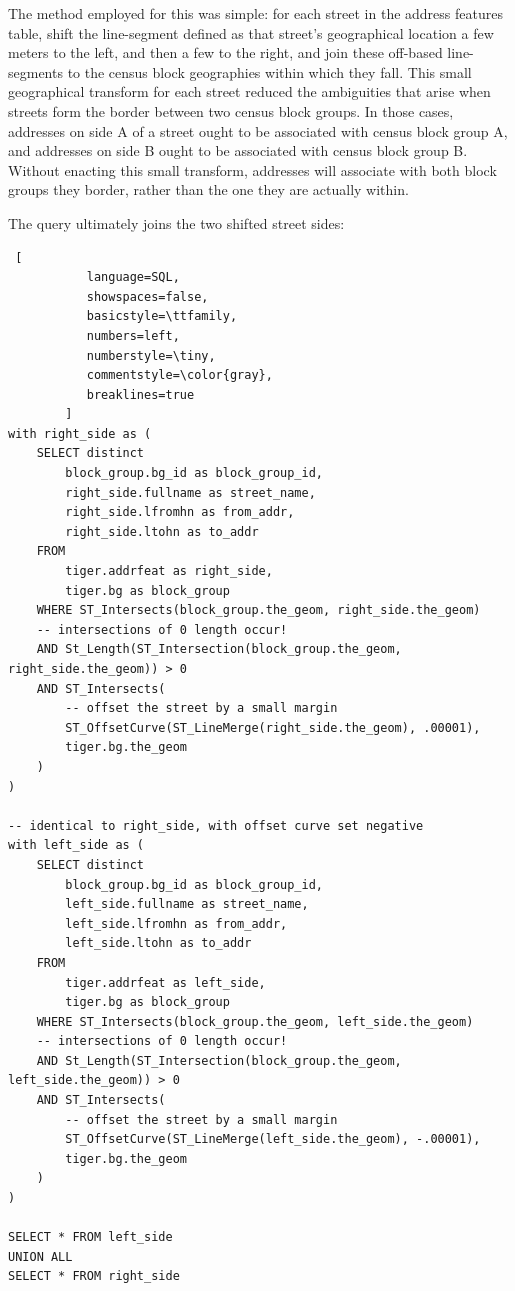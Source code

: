 \documentclass{sig-alternate}
\begin{document}
The method employed for this was simple: for each street in the address features table, shift the line-segment defined as that street's geographical location a few meters to the left, and then a few to the right, and join these off-based line-segments to the census block geographies within which they fall. This small geographical transform for each street reduced the ambiguities that arise when streets form the border between two census block groups. In those cases, addresses on side A of a street ought to be associated with census block group A, and addresses on side B ought to be associated with census block group B. Without enacting this small transform, addresses will associate with both block groups they border, rather than the one they are actually within.

The query ultimately joins the two shifted street sides:

\begin{lstlisting} [
           language=SQL,
           showspaces=false,
           basicstyle=\ttfamily,
           numbers=left,
           numberstyle=\tiny,
           commentstyle=\color{gray},
           breaklines=true
        ]
with right_side as (
    SELECT distinct
        block_group.bg_id as block_group_id,
        right_side.fullname as street_name,
        right_side.lfromhn as from_addr,
        right_side.ltohn as to_addr
    FROM
        tiger.addrfeat as right_side,
        tiger.bg as block_group
    WHERE ST_Intersects(block_group.the_geom, right_side.the_geom)
    -- intersections of 0 length occur!
    AND St_Length(ST_Intersection(block_group.the_geom, right_side.the_geom)) > 0
    AND ST_Intersects(
        -- offset the street by a small margin
        ST_OffsetCurve(ST_LineMerge(right_side.the_geom), .00001),
        tiger.bg.the_geom
    )
)

-- identical to right_side, with offset curve set negative
with left_side as (
    SELECT distinct
        block_group.bg_id as block_group_id,
        left_side.fullname as street_name,
        left_side.lfromhn as from_addr,
        left_side.ltohn as to_addr
    FROM
        tiger.addrfeat as left_side,
        tiger.bg as block_group
    WHERE ST_Intersects(block_group.the_geom, left_side.the_geom)
    -- intersections of 0 length occur!
    AND St_Length(ST_Intersection(block_group.the_geom, left_side.the_geom)) > 0
    AND ST_Intersects(
        -- offset the street by a small margin
        ST_OffsetCurve(ST_LineMerge(left_side.the_geom), -.00001),
        tiger.bg.the_geom
    )
)

SELECT * FROM left_side
UNION ALL
SELECT * FROM right_side
\end{lstlisting}
\end{document}
